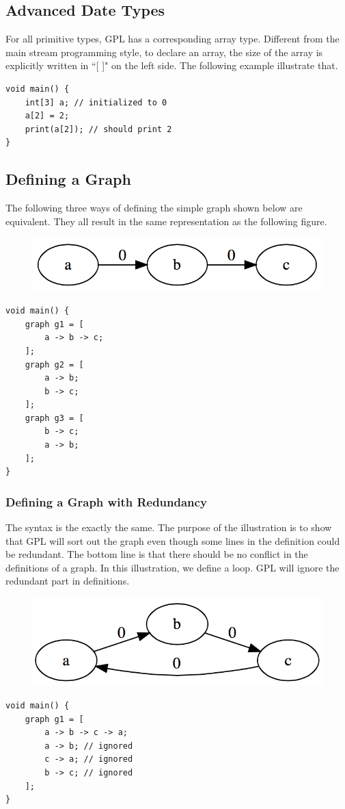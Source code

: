 \documentclass[a4paper,12pt]{article}
\begin{document}
\subsection{Advanced Date Types}
For all primitive types, GPL has a corresponding array type. Different from the main stream programming style, to declare an array, the size of the array is explicitly written in ``[ ]" on the left side. The following example illustrate that.
\begin{lstlisting}
void main() {
	int[3] a; // initialized to 0
	a[2] = 2;
	print(a[2]); // should print 2
}
\end{lstlisting}

\subsection{Defining a Graph}
The following three ways of defining the simple graph shown below are equivalent. They all result in the same representation as the following figure.
\begin{figure}[h]
	\centering
	\includegraphics[scale=0.5]{a->b->c.png}
\end{figure}
\begin{lstlisting}
void main() {
	graph g1 = [
		a -> b -> c;
	];
	graph g2 = [
		a -> b;
		b -> c;
	];
	graph g3 = [
		b -> c;
		a -> b;
	];
}
\end{lstlisting}

\subsubsection{Defining a Graph with Redundancy}
The syntax is the exactly the same. The purpose of the illustration is to show that GPL will sort out the graph even though some lines in the definition could be redundant. The bottom line is that there should be no conflict in the definitions of a graph. In this illustration, we define a loop. GPL will ignore the redundant part in definitions.
\begin{figure}[h]
	\centering
	\includegraphics[scale=0.5]{a->b->c->a.png}
\end{figure}
\begin{lstlisting}
void main() {
	graph g1 = [
		a -> b -> c -> a;
		a -> b; // ignored
		c -> a; // ignored
		b -> c; // ignored
	];
}
\end{lstlisting}
\end{document}
